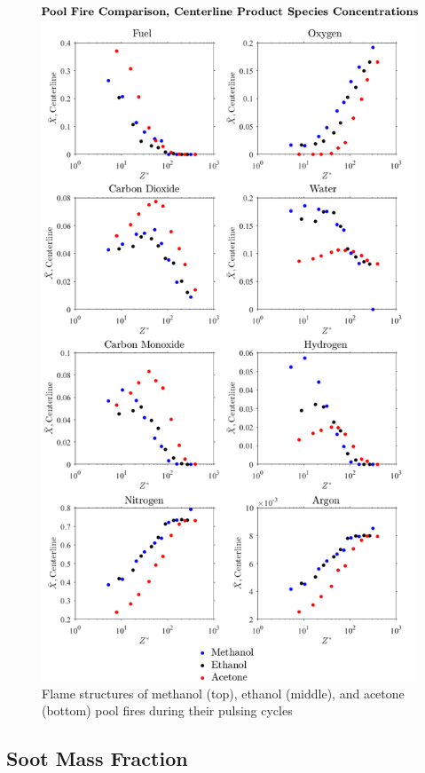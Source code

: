 \documentclass[12pt]{article}
\begin{document}
\begin{figure}[!]
	\centering
\includegraphics[width=12.0cm,keepaspectratio]{OVERALL_Fuel_Comparison.png}
	\caption[Major Species Comparison]{Flame structures of methanol (top), ethanol (middle), and acetone (bottom) pool fires during their pulsing cycles}
	\label{fig:Fuel_Comparison}
\end{figure}

\subsection{Soot Mass Fraction}
\label{ssec:Soot_Mass_Fraction}
\end{document}
